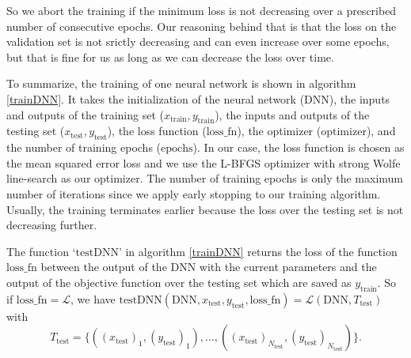So we abort the training if the minimum loss is not decreasing over a prescribed number of consecutive epochs. Our reasoning behind that is that the loss on the validation set is not srictly decreasing and can even increase over some epochs, but that is fine for us as long as we can decrease the loss over time.

To summarize, the training of one neural network is shown in algorithm \ref{trainDNN}. It takes the initialization of the neural network ($\mathrm{DNN}$), the inputs and outputs of the training set ($x_\mathrm{train}, y_\mathrm{train}$), the inputs and outputs of the testing set ($x_\mathrm{test}, y_\mathrm{test}$), the loss function ($\mathrm{loss\_fn}$), the optimizer ($\mathrm{optimizer}$), and the number of training epochs ($\mathrm{epochs}$). In our case, the loss function is chosen as the mean squared error loss and we use the L-BFGS optimizer with strong Wolfe line-search as our optimizer. The number of training epochs is only the maximum number of iterations since we apply early stopping to our training algorithm. Usually, the training terminates earlier because the loss over the testing set is not decreasing further.

The function `$\mathrm{testDNN}$' in algorithm \ref{trainDNN} returns the loss of the function $\mathrm{loss\_fn}$ between the output of the DNN with the current parameters and the output of the objective function over the testing set which are saved as $y_\mathrm{train}$. So if $\mathrm{loss\_fn}=\mathscr{L}$, we have $\mathrm{testDNN}(\mathrm{DNN}, x_\mathrm{test}, y_\mathrm{test}, \mathrm{loss\_fn}) = \mathscr{L}(\mathrm{DNN}, T_\mathrm{test})$ with
\begin{displaymath}
T_\mathrm{test}=\{((x_\mathrm{test})_1,(y_\mathrm{test})_1),\dotsc,((x_\mathrm{test})_{N_\mathrm{test}},(y_\mathrm{test})_{N_\mathrm{test}})\}.
\end{displaymath}

